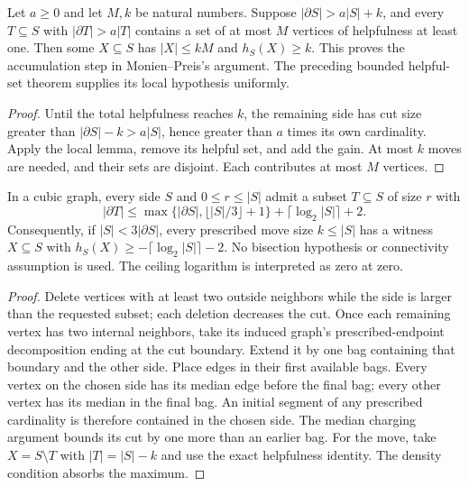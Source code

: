 \begin{theorem}
  \label{thm:lowerbounds-algebraic-helpful-amplification}
  \leanok
  Let $a\ge 0$ and let $M,k$ be natural numbers. Suppose
  $|\partial S|>a|S|+k$, and every $T\subseteq S$ with
  $|\partial T|>a|T|$ contains a set of at most $M$ vertices of
  helpfulness at least one. Then some $X\subseteq S$ has
  $|X|\le kM$ and $h_S(X)\ge k$. This proves the accumulation step in
  Monien--Preis's argument. The preceding bounded helpful-set theorem
  supplies its local hypothesis uniformly.
\end{theorem}
\begin{proof}
  \leanok
  Until the total helpfulness reaches $k$, the remaining side has cut
  size greater than $|\partial S|-k>a|S|$, hence greater than $a$
  times its own cardinality. Apply the local lemma, remove its helpful
  set, and add the gain. At most $k$ moves are needed, and their sets
  are disjoint. Each contributes at most $M$ vertices.
\end{proof}

\begin{theorem}
  \label{thm:lowerbounds-algebraic-rebalancing}
  \leanok
  In a cubic graph, every side $S$ and $0\le r\le |S|$ admit a subset
  $T\subseteq S$ of size $r$ with
  \[
    |\partial T|\le
    \max\{ |\partial S|,\lfloor |S|/3\rfloor+1\}
      +\lceil\log_2|S|\rceil+2.
  \]
  Consequently, if $|S|<3|\partial S|$, every prescribed move size
  $k\le |S|$ has a witness $X\subseteq S$ with
  $h_S(X)\ge-\lceil\log_2|S|\rceil-2$.
  No bisection hypothesis or connectivity assumption is used.
  The ceiling logarithm is interpreted as zero at zero.
\end{theorem}
\begin{proof}
  \leanok
  Delete vertices with at least two outside neighbors while the side is
  larger than the requested subset; each deletion decreases the cut.
  Once each remaining vertex has two internal neighbors, take its induced
  graph's prescribed-endpoint decomposition ending at the cut boundary.
  Extend it by one bag containing that boundary and the other side.
  Place edges in their first available bags. Every vertex on the chosen
  side has its median edge before the final bag; every other vertex has
  its median in the final bag. An initial segment of any prescribed
  cardinality is therefore contained in the chosen side. The median
  charging argument bounds its cut by one more than an earlier bag.
  For the move, take $X=S\setminus T$ with $|T|=|S|-k$ and use the exact
  helpfulness identity. The density condition absorbs the maximum.
\end{proof}

